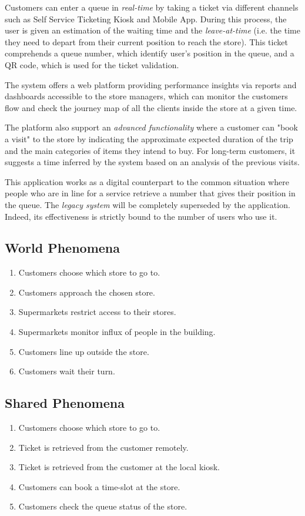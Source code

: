 Customers can enter a queue in \textit{real-time} by taking a ticket via different channels such as Self Service Ticketing Kiosk and Mobile App. During this process, the user is given an estimation of the waiting time and the \textit{leave-at-time} (i.e. the time they need to depart from their current position to reach the store). This ticket comprehends a queue number, which identify user's position in the queue, and a QR code, which is used for the ticket validation.

The system offers a web platform providing performance insights via reports and dashboards accessible to the store managers, which can monitor the customers flow and check the journey map of all the clients inside the store at a given time.

The platform also support an \textit{advanced functionality} where a customer can "book a visit" to the store by indicating the approximate expected duration of the trip and the main categories of items they intend to buy. For long-term customers, it suggests a time inferred by the system based on an analysis of the previous visits.

This application works as a digital counterpart to the common situation where people who are in line for a service retrieve a number that gives their position in the queue. The \textit{legacy system} will be completely superseded by the application. Indeed, its effectiveness is strictly bound to the number of users who use it.

\subsection{World Phenomena}
\begin{enumerate}[label=\textbf{WP.\arabic*}, leftmargin=+.425in]
	\item Customers choose which store to go to.
	\item Customers approach the chosen store.
	\item Supermarkets restrict access to their stores.
	\item Supermarkets monitor influx of people in the building.
	\item Customers line up outside the store.
	\item Customers wait their turn.
\end{enumerate}

\subsection{Shared Phenomena}
\begin{enumerate}[label=\textbf{SP.\arabic*}]
	\item Customers choose which store to go to.
	\item Ticket is retrieved from the customer remotely.
	\item Ticket is retrieved from the customer at the local kiosk.
	\item Customers can book a time-slot at the store.
	\item Customers check the queue status of the store.
\end{enumerate}

